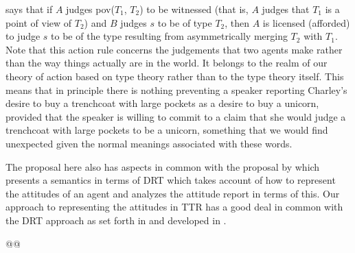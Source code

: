 \preveg{} says that if $A$ judges pov($T_1$, $T_2$) to be witnessed
(that is, $A$ judges that $T_1$ is a point of view of $T_2$) and $B$
judges $s$ to be of type $T_2$, then $A$ is licensed (afforded) to judge $s$ to be of the type
resulting from asymmetrically merging $T_2$ with $T_1$.  Note that
this action rule concerns the judgements that two agents make
rather than the way things actually are in the world.  It belongs to
the realm of our theory of action based on type theory rather than to
the type theory itself.  This means that in principle there is nothing
preventing a speaker reporting Charley's desire to buy a trenchcoat
with large pockets as a desire to buy a unicorn, provided that the
speaker is willing to commit to a claim that she would judge a
trenchcoat with large pockets to be a unicorn, something that we would
find unexpected given the normal meanings associated with these words.   

The proposal here also has aspects in common with the proposal by
\cite{Prossms} which presents a semantics in terms of DRT which takes
account of how to represent the attitudes of an agent and analyzes 
the attitude report in terms of this.  Our approach to representing
the attitudes in TTR has a good deal in common with the DRT approach
as set forth in \cite{Kamp1990,KampGenabithReyle2011} and developed in
\cite{Maier2016,Maier2017}.

@@

